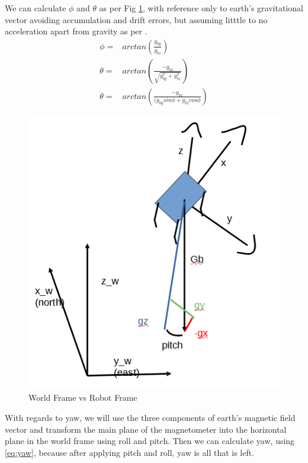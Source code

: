 \documentclass[conference]{IEEEtran}
\begin{document}
We can calculate $\phi$ and $\theta$ as per Fig \ref{fig:pitch}, with reference only to earth's gravitational vector avoiding accumulation and drift errors, but assuming litttle to no acceleration apart from gravity as per \cite{b19}.
\begin{align}
\phi =& arctan \left( \frac{g_{by}}{g_{bz}} \right)\\
\theta =& arctan \left( \frac{ - g_{bx}}{\sqrt{g_{by}^2 + g_{bz}^2}} \right ) \nonumber \\
\theta =& arctan \left( \frac{ - g_{bx}}{(g_{by} sin \phi + g_{bz} cos\phi} \right ) 
\end{align}

\begin{figure}[h!]
  \includegraphics[width=\columnwidth]{fig_1_pitch.png}
  \caption{World Frame vs Robot Frame}
  \label{fig:pitch}
\end{figure}

With regards to yaw, we will use the three components of earth's magnetic field vector and transform the main plane of the magnetometer into the horizontal plane in the world frame using roll and pitch. Then we can calculate yaw, using \eqref{eq:yaw}, because after applying pitch and roll, yaw is all that is left.
\end{document}
